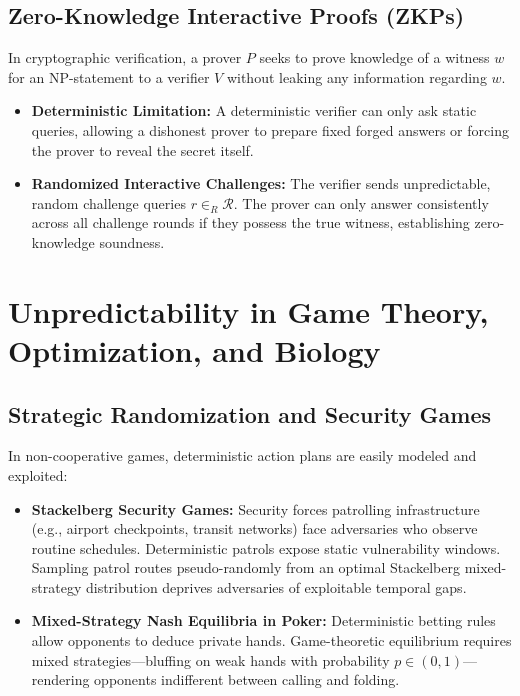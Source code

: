 \documentclass[11pt,a4paper]{article}
\begin{document}
\subsection{Zero-Knowledge Interactive Proofs (ZKPs)}
In cryptographic verification, a prover $P$ seeks to prove knowledge of a witness $w$ for an NP-statement to a verifier $V$ without leaking any information regarding $w$.
\begin{itemize}
    \item \textbf{Deterministic Limitation:} A deterministic verifier can only ask static queries, allowing a dishonest prover to prepare fixed forged answers or forcing the prover to reveal the secret itself.
    \item \textbf{Randomized Interactive Challenges:} The verifier sends unpredictable, random challenge queries $r \in_R \mathcal{R}$. The prover can only answer consistently across all challenge rounds if they possess the true witness, establishing zero-knowledge soundness.
\end{itemize}

\section{Unpredictability in Game Theory, Optimization, and Biology}

\subsection{Strategic Randomization and Security Games}
In non-cooperative games, deterministic action plans are easily modeled and exploited:
\begin{itemize}
    \item \textbf{Stackelberg Security Games:} Security forces patrolling infrastructure (e.g., airport checkpoints, transit networks) face adversaries who observe routine schedules. Deterministic patrols expose static vulnerability windows. Sampling patrol routes pseudo-randomly from an optimal Stackelberg mixed-strategy distribution deprives adversaries of exploitable temporal gaps.
    \item \textbf{Mixed-Strategy Nash Equilibria in Poker:} Deterministic betting rules allow opponents to deduce private hands. Game-theoretic equilibrium requires mixed strategies---bluffing on weak hands with probability $p \in (0, 1)$---rendering opponents indifferent between calling and folding.
\end{itemize}
\end{document}
